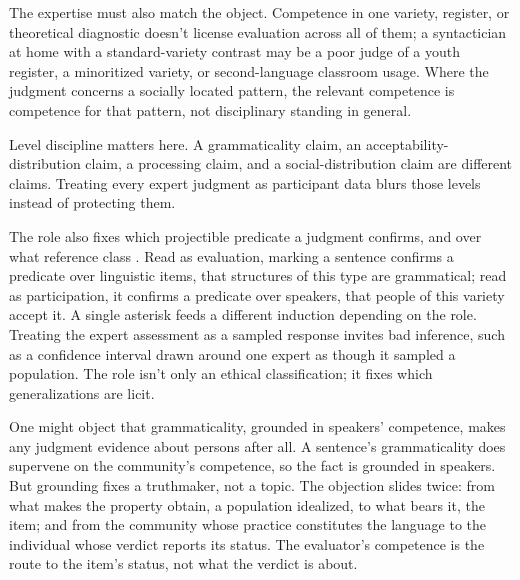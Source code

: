 The expertise must also match the object. Competence in one variety, register, or theoretical diagnostic doesn't license evaluation across all of them; a syntactician at home with a standard-variety contrast may be a poor judge of a youth register, a minoritized variety, or second-language classroom usage. Where the judgment concerns a socially located pattern, the relevant competence is competence for that pattern, not disciplinary standing in general.

Level discipline matters here. A grammaticality claim, an acceptability-distribution claim, a processing claim, and a social-distribution claim are different claims. Treating every expert judgment as participant data blurs those levels instead of protecting them.

The role also fixes which projectible predicate a judgment confirms, and over what reference class \citep{Goodman1955}. Read as evaluation, marking a sentence confirms a predicate over linguistic items, that structures of this type are grammatical; read as participation, it confirms a predicate over speakers, that people of this variety accept it. A single asterisk feeds a different induction depending on the role. Treating the expert assessment as a sampled response invites bad inference, such as a confidence interval drawn around one expert as though it sampled a population. The role isn't only an ethical classification; it fixes which generalizations are licit.

One might object that grammaticality, grounded in speakers' competence, makes any judgment evidence about persons after all. A sentence's grammaticality does supervene on the community's competence, so the fact is grounded in speakers. But grounding fixes a truthmaker, not a topic. The objection slides twice: from what makes the property obtain, a population idealized, to what bears it, the item; and from the community whose practice constitutes the language to the individual whose verdict reports its status. The evaluator's competence is the route to the item's status, not what the verdict is about.
